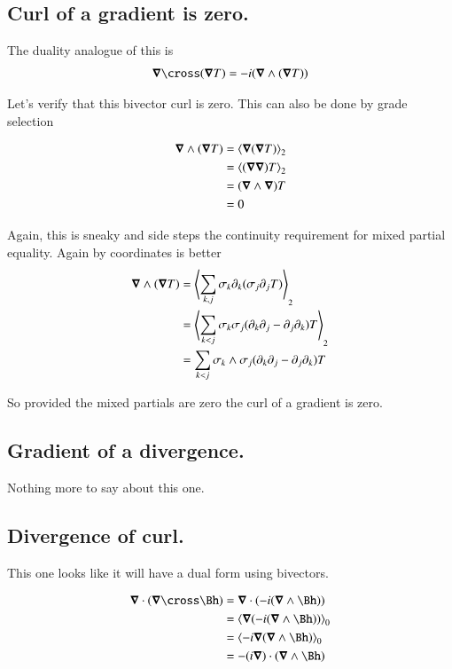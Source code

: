 \subsection{Curl of a gradient is zero. }

The duality analogue of this is
\begin{align*}
\spacegrad \cross (\spacegrad T) = -i(\spacegrad \wedge (\spacegrad T))
\end{align*}

Let's verify that this bivector curl is zero.  This can also be done by grade selection

\begin{align*}
\boldsymbol{\nabla} \wedge (\boldsymbol{\nabla} T) 
&= {\left\langle{{\boldsymbol{\nabla}(\boldsymbol{\nabla}T)}}\right\rangle}_{2} \\
&= {\left\langle{{(\boldsymbol{\nabla}\boldsymbol{\nabla}) T}}\right\rangle}_{2} \\
&= (\boldsymbol{\nabla} \wedge \boldsymbol{\nabla}) T \\
&= 0
\end{align*}

Again, this is sneaky and side steps the continuity requirement for mixed partial equality.  Again by coordinates is better
\begin{align*}
\boldsymbol{\nabla} \wedge (\boldsymbol{\nabla} T) 
&= {\left\langle{{\sum_{k,j}\sigma_k \partial_k (\sigma_j \partial_j T)}}\right\rangle}_{2} \\
&= {\left\langle{{\sum_{k<j}\sigma_k \sigma_j (\partial_k \partial_j - \partial_j \partial_k) T}}\right\rangle}_{2} \\
&= \sum_{k<j} \sigma_k \wedge \sigma_j (\partial_k \partial_j - \partial_j \partial_k) T \\
\end{align*}

So provided the mixed partials are zero the curl of a gradient is zero.

\subsection{Gradient of a divergence. }

Nothing more to say about this one.

\subsection{Divergence of curl. }

This one looks like it will have a dual form using bivectors.

\begin{align*}
\spacegrad \cdot (\spacegrad \cross \Bh)
&= \spacegrad \cdot (-i (\spacegrad \wedge \Bh)) \\
&= \gpgradezero{\spacegrad (-i (\spacegrad \wedge \Bh))} \\
&= \gpgradezero{-i \spacegrad (\spacegrad \wedge \Bh)} \\
&= -(i \spacegrad) \cdot (\spacegrad \wedge \Bh) \\
\end{align*}

